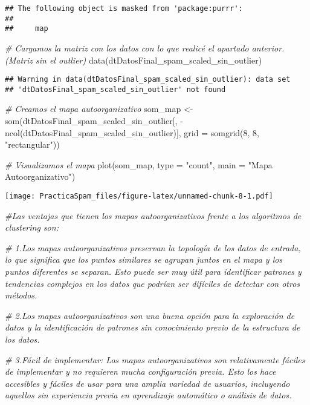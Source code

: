 \documentclass[
]{article}
\newenvironment{Shaded}{\begin{snugshade}}{\end{snugshade}}
\newcommand{\AttributeTok}[1]{\textcolor[rgb]{0.77,0.63,0.00}{#1}}
\newcommand{\CommentTok}[1]{\textcolor[rgb]{0.56,0.35,0.01}{\textit{#1}}}
\newcommand{\DecValTok}[1]{\textcolor[rgb]{0.00,0.00,0.81}{#1}}
\newcommand{\FunctionTok}[1]{\textcolor[rgb]{0.00,0.00,0.00}{#1}}
\newcommand{\NormalTok}[1]{#1}
\newcommand{\OtherTok}[1]{\textcolor[rgb]{0.56,0.35,0.01}{#1}}
\newcommand{\SpecialCharTok}[1]{\textcolor[rgb]{0.00,0.00,0.00}{#1}}
\newcommand{\StringTok}[1]{\textcolor[rgb]{0.31,0.60,0.02}{#1}}
\begin{document}
\begin{verbatim}
## The following object is masked from 'package:purrr':
## 
##     map
\end{verbatim}

\begin{Shaded}
\begin{Highlighting}[]
  \CommentTok{\# Cargamos la matriz con los datos con lo que realicé el apartado anterior.(Matriz sin el outlier)}
  \FunctionTok{data}\NormalTok{(dtDatosFinal\_spam\_scaled\_sin\_outlier)}
\end{Highlighting}
\end{Shaded}

\begin{verbatim}
## Warning in data(dtDatosFinal_spam_scaled_sin_outlier): data set
## 'dtDatosFinal_spam_scaled_sin_outlier' not found
\end{verbatim}

\begin{Shaded}
\begin{Highlighting}[]
  \CommentTok{\# Creamos el mapa autoorganizativo}
\NormalTok{  som\_map }\OtherTok{\textless{}{-}} \FunctionTok{som}\NormalTok{(dtDatosFinal\_spam\_scaled\_sin\_outlier[, }\SpecialCharTok{{-}}\FunctionTok{ncol}\NormalTok{(dtDatosFinal\_spam\_scaled\_sin\_outlier)], }\AttributeTok{grid =} \FunctionTok{somgrid}\NormalTok{(}\DecValTok{8}\NormalTok{, }\DecValTok{8}\NormalTok{, }\StringTok{"rectangular"}\NormalTok{))}

  \CommentTok{\# Visualizamos el mapa}
  \FunctionTok{plot}\NormalTok{(som\_map, }\AttributeTok{type =} \StringTok{"count"}\NormalTok{, }\AttributeTok{main =} \StringTok{"Mapa Autoorganizativo"}\NormalTok{)}
\end{Highlighting}
\end{Shaded}

\texttt{[image: PracticaSpam\_files/figure-latex/unnamed-chunk-8-1.pdf]}

\begin{Shaded}
\begin{Highlighting}[]
  \CommentTok{\#Las ventajas que tienen los mapas autoorganizativos frente a los algoritmos de clustering son:}
  
  \CommentTok{\# 1.Los mapas autoorganizativos preservan la topología de los datos de entrada, lo que significa que los puntos      similares se agrupan juntos en el mapa y los puntos diferentes se separan. Esto puede ser muy útil para              identificar patrones y tendencias complejos en los datos que podrían ser difíciles de detectar con otros             métodos.}
  
  \CommentTok{\# 2.Los mapas autoorganizativos son una buena opción para la exploración de datos y la                               identificación de patrones sin conocimiento previo de la estructura de los datos.}
  
  \CommentTok{\# 3.Fácil de implementar: Los mapas autoorganizativos son relativamente fáciles de implementar y no requieren mucha   configuración previa. Esto los hace accesibles y fáciles de usar para una amplia variedad de usuarios, incluyendo    aquellos sin experiencia previa en aprendizaje automático o análisis de datos.}
\end{Highlighting}
\end{Shaded}
\end{document}
